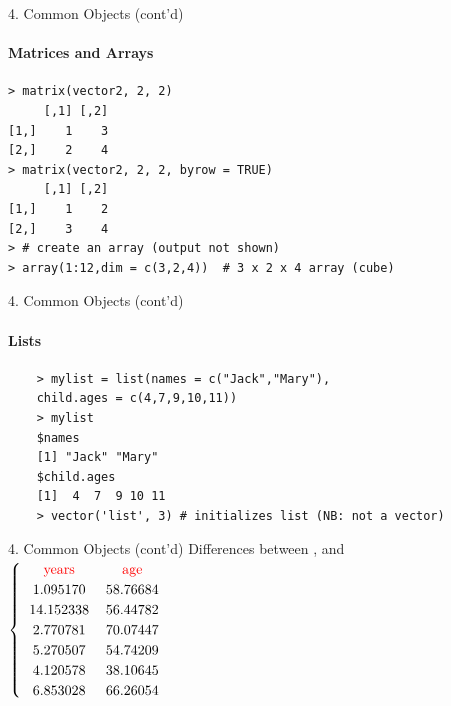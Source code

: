 \documentclass[14pt, aspectratio=169, sectionpage=simple, xclolor=table]{beamer}
\begin{document}
\begin{frame}[fragile]{4. Common \R Objects (cont'd)}
\framesubtitle{Matrices and Arrays}
\vspace*{-5mm}
{\small
\begin{verbatim}
> matrix(vector2, 2, 2)
     [,1] [,2]
[1,]    1    3
[2,]    2    4
> matrix(vector2, 2, 2, byrow = TRUE)
     [,1] [,2]
[1,]    1    2
[2,]    3    4
> # create an array (output not shown)
> array(1:12,dim = c(3,2,4))  # 3 x 2 x 4 array (cube)
\end{verbatim}
}
\end{frame}


\begin{frame}[fragile]{4. Common \R Objects (cont'd)}
\framesubtitle{Lists}
\vspace*{-5mm}
{\small
	\begin{verbatim}
	> mylist = list(names = c("Jack","Mary"),
	child.ages = c(4,7,9,10,11))
	> mylist
	$names
	[1] "Jack" "Mary"
	$child.ages
	[1]  4  7  9 10 11
	> vector('list', 3) # initializes list (NB: not a vector)
	\end{verbatim}
}
\end{frame}
\begin{frame}[fragile]{4. Common \R Objects (cont'd)}
\vspace*{-5mm}
Differences between ,  and \newline\newline
\small{
$\begin{cases}
\begin{tabular}{cc}
\textcolor{red}{years} &  \textcolor{red}{age}  \\
1.095170& 58.76684\\
14.152338& 56.44782\\
2.770781& 70.07447\\
5.270507& 54.74209\\
4.120578& 38.10645\\
6.853028& 66.26054\\
\end{tabular}
\end{cases}$
}

\end{frame}
\end{document}
